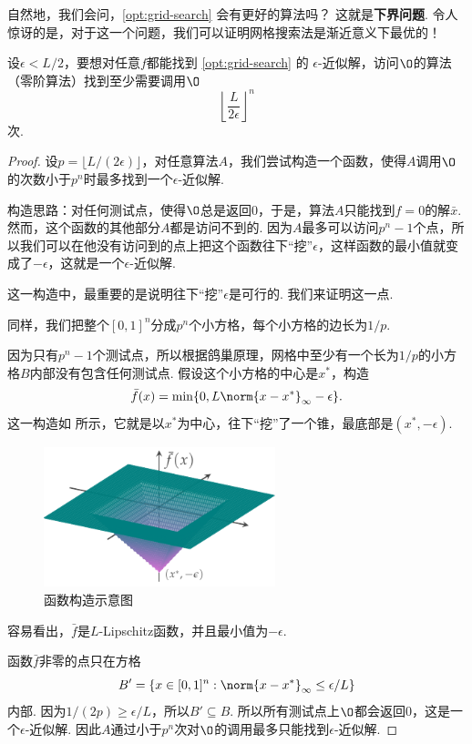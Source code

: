 自然地，我们会问，\eqref{opt:grid-search} 会有更好的算法吗？ 这就是\textbf{下界问题}. 令人惊讶的是，对于这一个问题，我们可以证明网格搜索法是渐近意义下最优的！

\begin{theorem}\label{thm:grid-search-lower-bound}
    设$\epsilon<L/2$，要想对任意$f$都能找到 \eqref{opt:grid-search} 的 $\epsilon$-近似解，访问$\O$的算法（零阶算法）找到至少需要调用$\O$
    \[\left\lfloor\frac{L}{2\epsilon}\right\rfloor^n\]
    次.
\end{theorem}
\begin{proof}
设$p=\lfloor L/(2\epsilon)\rfloor$，对任意算法$A$，我们尝试构造一个函数，使得$A$调用$\O$的次数小于$p^n$时最多找到一个$\epsilon$-近似解.

构造思路：对任何测试点，使得$\O$总是返回$0$，于是，算法$A$只能找到$f=0$的解$\bar{x}$. 然而，这个函数的其他部分$A$都是访问不到的. 因为$A$最多可以访问$p^n-1$个点，所以我们可以在他没有访问到的点上把这个函数往下“挖”$\epsilon$，这样函数的最小值就变成了$-\epsilon$，这就是一个$\epsilon$-近似解.

这一构造中，最重要的是说明往下“挖”$\epsilon$是可行的. 我们来证明这一点.

同样，我们把整个$[0,1]^n$分成$p^n$个小方格，每个小方格的边长为$1/p$. 

因为只有$p^n-1$个测试点，所以根据鸽巢原理，网格中至少有一个长为$1/p$的小方格$B$内部没有包含任何测试点. 假设这个小方格的中心是$x^*$，构造
    \[\bar f(x)=\min\{0,L\norm{x-x^*}_\infty-\epsilon\}.\]
这一构造如 所示，它就是以$x^*$为中心，往下“挖”了一个锥，最底部是$(x^*,-\epsilon)$.

\begin{figure}[H]
    \centering
    \includegraphics[width=0.6\textwidth]{Figures/convex-anlaysis/grid-func.pdf}
    \caption{函数构造示意图}
    \label{fig:grid-func}
\end{figure}

容易看出，$\bar f$是$L$-Lipschitz函数，并且最小值为$-\epsilon$.

函数$\bar f$非零的点只在方格
    \[B'=\{x\in[0,1]^n:\norm{x-x^*}_\infty\leq\epsilon/L\}\]
内部. 因为$1/(2p)\geq \epsilon/L$，所以$B'\subseteq B$. 所以所有测试点上$\O$都会返回$0$，这是一个$\epsilon$-近似解. 因此$A$通过小于$p^n$次对$\O$的调用最多只能找到$\epsilon$-近似解.
\end{proof}

